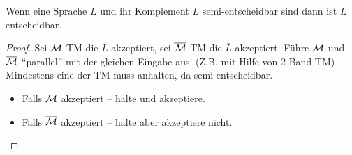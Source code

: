 


\begin{Satz}[name={[{$L,\overline{L}$ semi-entscheidbar $\=> L$ entscheidbar}]},restate={[name=Wiederholung]repeatSatz613}]\label{satz:6.13}
    Wenn eine Sprache $L$ und ihr Komplement $\overline{L}$ semi-entscheidbar sind dann ist $L$ entscheidbar.
\end{Satz}
\begin{proof}
	Sei $\mathcal{M}$ \ac{TM} die $L$ akzeptiert, sei $\overline{\mathcal{M}}$ \ac{TM} die $\overline{L}$ akzeptiert.
	Führe $\mathcal{M}$ und $\overline{\mathcal{M}}$ "`parallel"' mit der gleichen Eingabe aus. (Z.B. mit Hilfe von 2-Band \ac{TM})\\
	Mindestens eine der \ac{TM} muss anhalten, da semi-entscheidbar.
	\begin{itemize}
	\item Falls $\mathcal{M}$ akzeptiert -- halte und akzeptiere.
	\item Falls $\overline{\mathcal{M}}$ akzeptiert -- halte aber akzeptiere nicht. \qedhere
	\end{itemize}
\end{proof}


